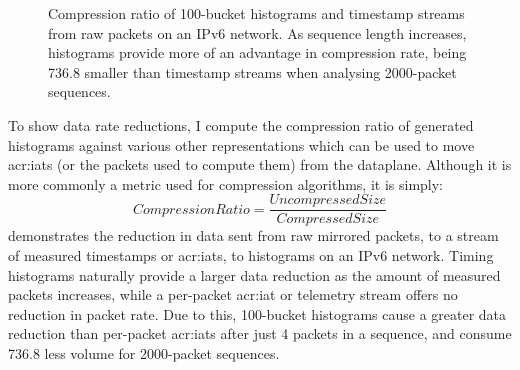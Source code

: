 \begin{figure}
    \centering
    \caption[Compression ratio of \num{100}-bucket histograms and timestamp streams from raw packets on an IPv6 network.]{Compression ratio of \num{100}-bucket histograms and timestamp streams from raw packets on an IPv6 network. As sequence length increases, histograms provide more of an advantage in compression rate, being \qty{736.8}{\times} smaller than timestamp streams when analysing \num{2000}-packet sequences.}
    \label{fig:histo-compression}
\end{figure}

To show data rate reductions, I compute the compression ratio of generated histograms against various other representations which can be used to move \glspl{acr:iat} (or the packets used to compute them) from the dataplane.
Although it is more commonly a metric used for compression algorithms, it is simply:
$$\mathit{Compression Ratio} = \frac{\mathit{Uncompressed Size}}{\mathit{Compressed Size}}$$
 demonstrates the reduction in data sent from raw mirrored packets, to a stream of measured timestamps or \glspl{acr:iat}, to \seidr{} histograms on an IPv6 network.
Timing histograms naturally provide a larger data reduction as the amount of measured packets increases, while a per-packet \gls{acr:iat} or telemetry stream offers no reduction in packet rate.
Due to this, 100-bucket histograms cause a greater data reduction than per-packet \glspl{acr:iat} after just 4 packets in a sequence, and consume \qty{736.8}{\times} less volume for \num{2000}-packet sequences.

